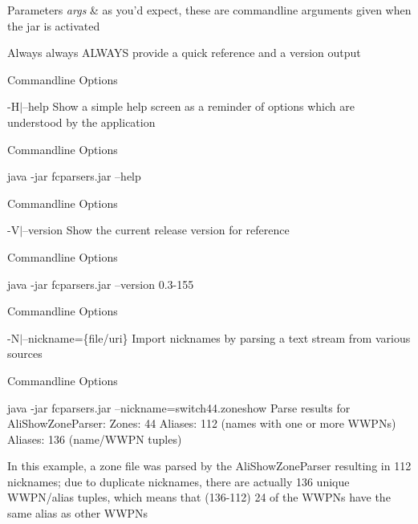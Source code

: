 \begin{DoxyParams}{Parameters}
{\em args} & as you'd expect, these are commandline arguments given when the jar is activated \\
\hline
\end{DoxyParams}
\begin{DoxyVerb}Always always ALWAYS provide a quick reference and a version output
\end{DoxyVerb}


\begin{DoxyRefDesc}{Commandline Options}
\item[{\bf Commandline Options}]-\/\+H$\vert$--help Show a simple help screen as a reminder of options which are understood by the application \end{DoxyRefDesc}
\begin{DoxyRefDesc}{Commandline Options}
\item[{\bf Commandline Options}]
\begin{DoxyCode}
java -jar fcparsers.jar --help 
\end{DoxyCode}
\end{DoxyRefDesc}


\begin{DoxyRefDesc}{Commandline Options}
\item[{\bf Commandline Options}]-\/\+V$\vert$--version Show the current release version for reference \end{DoxyRefDesc}
\begin{DoxyRefDesc}{Commandline Options}
\item[{\bf Commandline Options}]
\begin{DoxyCode}
java -jar fcparsers.jar --version
0.3-155 
\end{DoxyCode}
\end{DoxyRefDesc}


\begin{DoxyRefDesc}{Commandline Options}
\item[{\bf Commandline Options}]-\/\+N$\vert$--nickname=\{file/uri\} Import nicknames by parsing a text stream from various sources \end{DoxyRefDesc}
\begin{DoxyRefDesc}{Commandline Options}
\item[{\bf Commandline Options}]
\begin{DoxyCode}
 java -jar fcparsers.jar --nickname=switch44.zoneshow
Parse results \textcolor{keywordflow}{for} AliShowZoneParser:
Zones: 44
Aliases: 112 (names with one or more WWPNs)
Aliases: 136 (name/WWPN tuples) 
\end{DoxyCode}
 In this example, a zone file was parsed by the Ali\+Show\+Zone\+Parser resulting in 112 nicknames; due to duplicate nicknames, there are actually 136 unique W\+W\+P\+N/alias tuples, which means that (136-\/112) 24 of the W\+W\+P\+Ns have the same alias as other W\+W\+P\+Ns\end{DoxyRefDesc}


